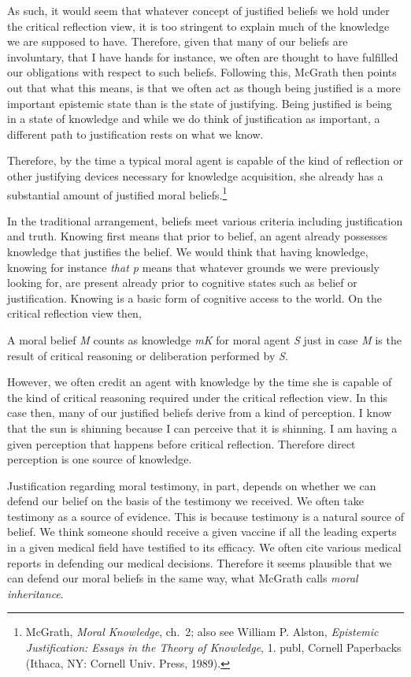 \documentclass[
  12pt,
]{book}
\theoremstyle{definition}
\theoremstyle{definition}
\theoremstyle{definition}
\theoremstyle{definition}
\theoremstyle{remark}
\begin{document}
As such, it would seem that whatever concept of justified beliefs we hold under the critical reflection view, it is too stringent to explain much of the knowledge we are supposed to have. Therefore, given that many of our beliefs are involuntary, that I have hands for instance, we often are thought to have fulfilled our obligations with respect to such beliefs. Following this, McGrath then points out that what this means, is that we often act as though being justified is a more important epistemic state than is the state of justifying. Being justified is being in a state of knowledge and while we do think of justification as important, a different path to justification rests on what we know.

Therefore, by the time a typical moral agent is capable of the kind of reflection or other justifying devices necessary for knowledge acquisition, she already has a substantial amount of justified moral beliefs.\footnote{McGrath, \emph{Moral {Knowledge}}, ch.~2; also see William P. Alston, \emph{Epistemic Justification: Essays in the Theory of Knowledge}, 1. publ, Cornell Paperbacks (Ithaca, NY: Cornell Univ. Press, 1989).}

In the traditional arrangement, beliefs meet various criteria including justification and truth. Knowing first means that prior to belief, an agent already possesses knowledge that justifies the belief. We would think that having knowledge, knowing for instance \emph{that p} means that whatever grounds we were previously looking for, are present already prior to cognitive states such as belief or justification. Knowing is a basic form of cognitive access to the world. On the critical reflection view then,

A moral belief \emph{M} counts as knowledge \emph{mK} for moral agent \emph{S} just in case \emph{M} is the result of critical reasoning or deliberation performed by \emph{S}.

However, we often credit an agent with knowledge by the time she is capable of the kind of critical reasoning required under the critical reflection view. In this case then, many of our justified beliefs derive from a kind of perception. I know that the sun is shinning because I can perceive that it is shinning. I am having a given perception that happens before critical reflection. Therefore direct perception is one source of knowledge.

Justification regarding moral testimony, in part, depends on whether we can defend our belief on the basis of the testimony we received. We often take testimony as a source of evidence. This is because testimony is a natural source of belief. We think someone should receive a given vaccine if all the leading experts in a given medical field have testified to its efficacy. We often cite various medical reports in defending our medical decisions. Therefore it seems plausible that we can defend our moral beliefs in the same way, what McGrath calls \emph{moral inheritance}.
\end{document}
